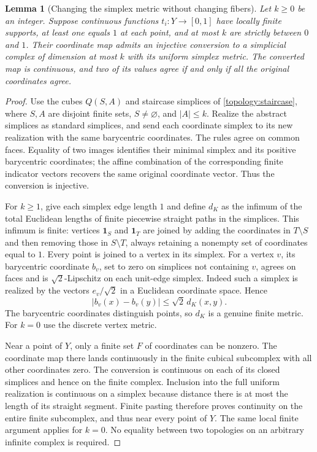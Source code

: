 \documentclass[11pt]{article}
\numberwithin{equation}{section}
\newtheorem{lemma}[theorem]{Lemma}
\theoremstyle{definition}
\theoremstyle{remark}
\begin{document}
\begin{lemma}[Changing the simplex metric without changing fibers]
\label{cover:uniform}
Let $k\ge0$ be an integer.  Suppose continuous functions $t_i:Y\to[0,1]$ have locally finite
supports, at least one equals $1$ at each point, and at most $k$ are
strictly between $0$ and $1$.  Their coordinate map admits an injective
conversion to a simplicial complex of dimension at most $k$ with its
uniform simplex metric.  The converted map is continuous, and two of
its values agree if and only if all the original coordinates agree.
\end{lemma}
\begin{proof}
Use the cubes $Q(S,A)$ and staircase simplices of
\eqref{topology:staircase}, where $S,A$ are disjoint finite sets,
$S\ne\varnothing$, and $|A|\le k$.  Realize the abstract simplices
as standard simplices, and send each coordinate simplex to its new
realization with the same barycentric coordinates.  The rules agree
on common faces.  Equality of two images identifies their minimal
simplex and its positive barycentric coordinates; the affine
combination of the corresponding finite indicator vectors recovers
the same original coordinate vector.  Thus the conversion is injective.

For $k\ge1$, give each simplex edge length $1$ and define $d_K$
as the infimum of the total Euclidean lengths of finite piecewise
straight paths in the simplices.  This infimum is finite: vertices
$\mathbf1_S$ and $\mathbf1_T$ are joined by adding the coordinates
in $T\setminus S$ and then removing those in $S\setminus T$, always
retaining a nonempty set of coordinates equal to $1$.  Every point
is joined to a vertex in its simplex.  For a vertex $v$, its
barycentric coordinate $b_v$, set to zero on simplices not containing
$v$, agrees on faces and is $\sqrt2$-Lipschitz on each unit-edge
simplex.  Indeed such a simplex is realized by the vectors
$e_v/\sqrt2$ in a Euclidean coordinate space.  Hence
\[
 |b_v(x)-b_v(y)|\le\sqrt2\,d_K(x,y).
\]
The barycentric coordinates distinguish points, so $d_K$ is a genuine
finite metric.  For $k=0$ use the discrete vertex metric.

Near a point of $Y$, only a finite set $F$ of coordinates can be
nonzero.  The coordinate map there lands continuously in the finite
cubical subcomplex with all other coordinates zero.  The conversion
is continuous on each of its closed simplices and hence on the finite
complex.  Inclusion into the full uniform realization is continuous
on a simplex because distance there is at most the length of its
straight segment.  Finite pasting therefore proves continuity on
the entire finite subcomplex, and thus near every point of $Y$.
The same local finite argument applies for $k=0$.  No equality between two topologies on an arbitrary
infinite complex is required.
\end{proof}
\end{document}

